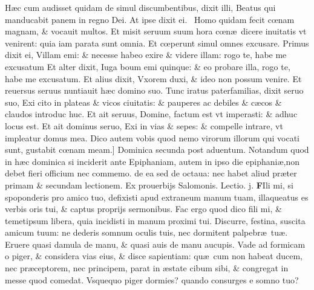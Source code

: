 \documentclass[a5paper,10pt]{book}
\def\leftmarginnote{%
	\lrmarginnote{\hskip -\marginparsep \hskip -6.5em}}
\def\ae{æ}
\def\oe{œ}
\begin{document}
\begin{multicols*}{2}
H\ae c cum audisset quidam de simul discumbentibus, dixit illi, Beatus qui manducabit panem in regno Dei.
At ipse dixit ei. \textdagger \ 
Homo\leftmarginnote{\begin{flushright}C\end{flushright}} quidam fecit c\oe nam magnam, \& vocauit multos.
Et misit seruum suum hora c\oe n\ae \ dicere inuitatis vt venirent: quia iam parata sunt omnia. Et c\oe perunt simul omnes excusare.
Primus dixit ei, Villam emi: \& necesse habeo exire \& videre illam: rogo te, habe me excusatum Et alter dixit, Iuga boum emi quinque: \& eo probare illa, rogo te, habe me excusatum.
Et alius dixit, Vxorem duxi, \& ideo non possum venire. Et reuersus seruus nuntiauit h\ae c domino suo.
Tunc iratus paterfamilias, dixit seruo suo, Exi cito in plateas \& vicos ciuitatis: \& pauperes ac debiles \& c\ae cos \& claudos introduc huc.
Et ait seruus, Domine, factum est vt imperasti: \& adhuc locus est. Et ait dominus seruo, Exi in vias \& sepes: \& compelle intrare, vt impleatur domus mea.
Dico autem vobis quod nemo virorum illorum qui vocati sunt, gustabit c\oe nam meam.]
\newline \textswab{C} \color{red} \hypertarget{SUN-SECVNDA-POST-ADV}{Dominica secunda post aduentum.}\color{black}
\bookmark[rellevel=-1,dest=SUN-SECVNDA-POST-ADV]{DOMINICA II POST ADVENTVM}
\newline \color{red} Notandum quod in h\ae c dominica si inciderit ante Epiphaniam, autem in ipso die epiphani\ae ,non debet fieri officium nec commemo. de ea sed de octaua: nec habet aliud pr\ae ter primam \& secundam lectionem. \color{black}
\newline \color{red} Ex prouerbijs Salomonis. \hfill Lectio. j. \color{black}
\vspace{-1.25em}
\lettrine[lines=2]{\bfseries F}{}Ili\leftmarginnote{\begin{flushright}ca. 6.\end{flushright}} mi, si spoponderis pro amico tuo, defixisti apud extraneum manum tuam, illaqueatus es verbis oris tui, \& captus proprijs sermonibus.
Fac ergo quod dico fili mi, \& temetipsum libera, quia incidisti in manum proximi tui.
Discurre, festina, suscita amicum tuum: ne dederis somnum oculis tuis, nec dormitent palpebr\ae \ tu\ae .
Eruere quasi damula de manu, \& quasi auis de manu aucupis.
Vade ad formicam o piger, \& considera vias eius, \& disce sapientiam: qu\ae \ cum non habeat ducem, nec pr\ae ceptorem, nec principem, parat in \ae state cibum sibi, \& congregat in messe quod comedat.
Vsquequo piger dormies? quando consurges e somno tuo?

\end{multicols*}
\end{document}
